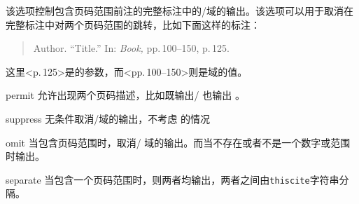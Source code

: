 \begin{optionlist}



该选项控制包含页码范围前注的完整标注中的\slash{}域的输出。该选项可以用于取消在完整标注中对两个页码范围的跳转，比如下面这样的标注：

\begin{quote}
Author. \enquote{Title.} In: \emph{Book,} pp.\,100--150, p.\,125.
\end{quote}


这里<p.\,125>是的参数，而<pp.\,100--150>则是域的值。

\begin{valuelist}
\item[permit] %
    允许出现两个页码描述，比如既输出\slash{} 也输出 。

\item[suppress] %
    无条件取消\slash {}域的输出，不考虑
    的情况

\item[omit] %
    当包含页码范围时，取消\slash {} 域的输出。而当不存在或者不是一个数字或范围时输出。

\item[separate] %
    当包含一个页码范围时，则两者均输出，两者之间由\texttt{thiscite}字符串分隔。
\end{valuelist}

\end{optionlist}

